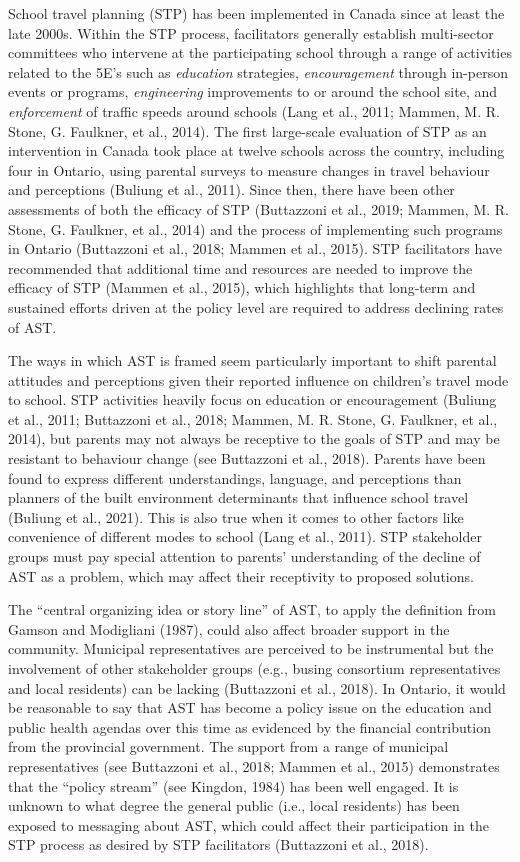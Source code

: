 \documentclass[]{elsarticle} %
\begin{document}
School travel planning (STP) has been implemented in Canada since at
least the late 2000s. Within the STP process, facilitators generally
establish multi-sector committees who intervene at the participating
school through a range of activities related to the 5E's such as
\emph{education} strategies, \emph{encouragement} through in-person
events or programs, \emph{engineering} improvements to or around the
school site, and \emph{enforcement} of traffic speeds around schools
(Lang et al., 2011; Mammen, M. R. Stone, G. Faulkner, et al., 2014). The
first large-scale evaluation of STP as an intervention in Canada took
place at twelve schools across the country, including four in Ontario,
using parental surveys to measure changes in travel behaviour and
perceptions (Buliung et al., 2011). Since then, there have been other
assessments of both the efficacy of STP (Buttazzoni et al., 2019;
Mammen, M. R. Stone, G. Faulkner, et al., 2014) and the process of
implementing such programs in Ontario (Buttazzoni et al., 2018; Mammen
et al., 2015). STP facilitators have recommended that additional time
and resources are needed to improve the efficacy of STP (Mammen et al.,
2015), which highlights that long-term and sustained efforts driven at
the policy level are required to address declining rates of AST.

The ways in which AST is framed seem particularly important to shift
parental attitudes and perceptions given their reported influence on
children's travel mode to school. STP activities heavily focus on
education or encouragement (Buliung et al., 2011; Buttazzoni et al.,
2018; Mammen, M. R. Stone, G. Faulkner, et al., 2014), but parents may
not always be receptive to the goals of STP and may be resistant to
behaviour change (see Buttazzoni et al., 2018). Parents have been found
to express different understandings, language, and perceptions than
planners of the built environment determinants that influence school
travel (Buliung et al., 2021). This is also true when it comes to other
factors like convenience of different modes to school (Lang et al.,
2011). STP stakeholder groups must pay special attention to parents'
understanding of the decline of AST as a problem, which may affect their
receptivity to proposed solutions.

The ``central organizing idea or story line'' of AST, to apply the
definition from Gamson and Modigliani (1987), could also affect broader
support in the community. Municipal representatives are perceived to be
instrumental but the involvement of other stakeholder groups (e.g.,
busing consortium representatives and local residents) can be lacking
(Buttazzoni et al., 2018). In Ontario, it would be reasonable to say
that AST has become a policy issue on the education and public health
agendas over this time as evidenced by the financial contribution from
the provincial government. The support from a range of municipal
representatives (see Buttazzoni et al., 2018; Mammen et al., 2015)
demonstrates that the ``policy stream'' (see Kingdon, 1984) has been
well engaged. It is unknown to what degree the general public (i.e.,
local residents) has been exposed to messaging about AST, which could
affect their participation in the STP process as desired by STP
facilitators (Buttazzoni et al., 2018).
\end{document}
